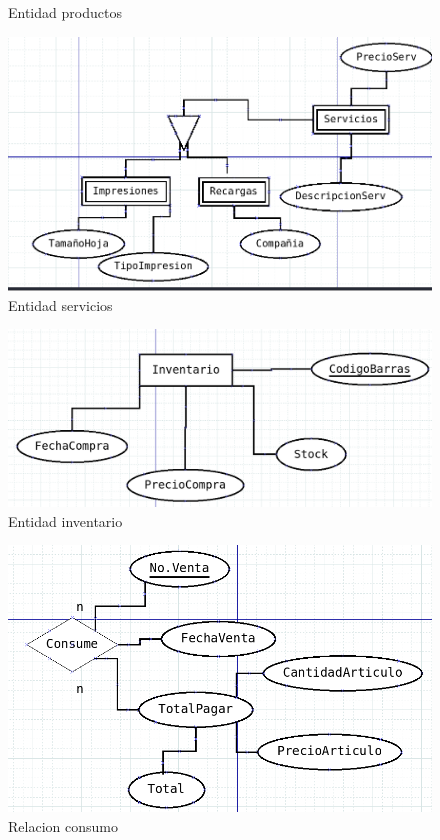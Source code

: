 \documentclass[letter,12pt]{article}
\begin{document}
\begin{center}
\begin{figure}[H]
\caption{Entidad productos}
\end{figure}
\begin{figure}[H]
\includegraphics[scale=.45]{servicios.png}
\caption{Entidad servicios}
\end{figure}
\newpage
\begin{figure}[H]
\includegraphics[scale=.4]{inventario.png}
\caption{Entidad inventario}
\end{figure}
\begin{figure}[H]
\includegraphics[scale=.45]{venta.png}
\caption{Relacion consumo}
\end{figure}
\newpage
\end{center}
\end{document}
